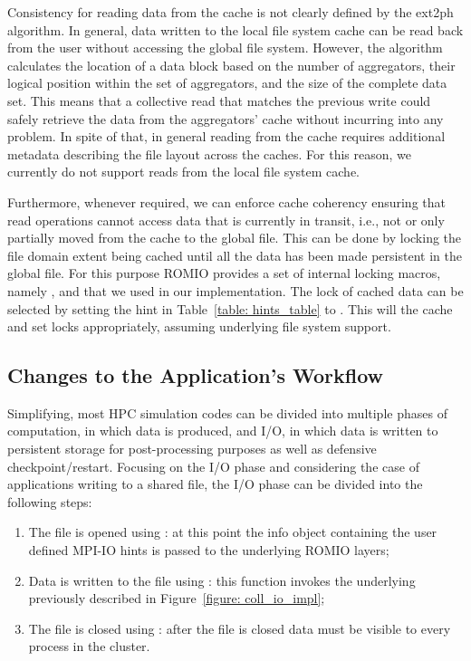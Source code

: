 Consistency for reading data from the cache is not clearly defined by the ext2ph algorithm. In general, data written to the local file system cache can be read back from the user without accessing the global 
file system. However, the algorithm calculates the location of a data block based on the number of aggregators, their logical position within the set of aggregators, and the size of the complete data set. 
This means that a collective read that matches the previous write could safely retrieve the data from the aggregators' cache without incurring into any problem. In spite of that, in general reading from the 
cache requires additional metadata describing the file layout across the caches. For this reason, we currently do not support reads from the local file system cache.

Furthermore, whenever required, we can enforce cache coherency ensuring that read operations cannot access data that is currently in transit, i.e., not or only partially moved from the cache to the global file. 
This can be done by locking the file domain extent being cached until all the data has been made persistent in the global file. For this purpose ROMIO provides a set of internal locking macros, namely 
,  and  that we used in our implementation. The lock of cached data can be selected by setting the  hint in 
Table~\ref{table: hints_table} to . This will  the cache and set locks appropriately, assuming underlying file system support.

\subsection{Changes to the Application's Workflow}
Simplifying, most HPC simulation codes can be divided into multiple phases of computation, in which data is produced, and I/O, in which data is written to persistent storage for post-processing purposes as well as 
defensive checkpoint/restart. Focusing on the I/O phase and considering the case of applications writing to a shared file, the I/O phase can be divided into the following steps:

\begin{enumerate}
\item The file is opened using : at this point the info object containing the user defined MPI-IO hints is passed to the underlying ROMIO layers;
\item Data is written to the file using : this function invokes the underlying  previously described in Figure~\ref{figure: coll_io_impl};
\item The file is closed using : after the file is closed data must be visible to every process in the cluster. 
\end{enumerate}

